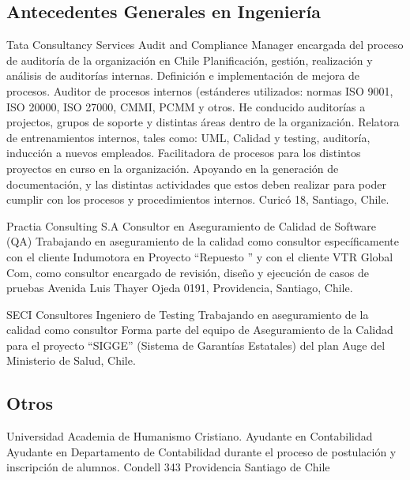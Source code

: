 \documentclass[11pt,letterpaper,roman]{moderncv}
\begin{document}
\subsection{Antecedentes Generales en Ingeniería}
	{Tata Consultancy Services} %
	{Audit and Compliance Manager} %
	{encargada del proceso de auditoría de la organización en Chile}
	{Planificación, gestión, realización y análisis de auditorías internas. Definición e implementación de mejora de procesos. 
	Auditor de procesos internos (estánderes utilizados: normas ISO 9001, ISO 20000, ISO 27000, CMMI, PCMM y otros.
	He conducido auditorías a projectos, grupos de soporte y distintas áreas dentro de la organización. 
	Relatora de entrenamientos internos, tales como: UML, Calidad y testing, auditoría, inducción a nuevos empleados.
	Facilitadora de procesos para los distintos proyectos en curso en la organización.
	Apoyando en la generación de documentación, y las distintas actividades que estos deben realizar para poder cumplir con los procesos y procedimientos internos.
	}
	{Curicó 18, Santiago, Chile.}
	
	{Practia Consulting S.A} %
	{Consultor en Aseguramiento de Calidad de Software (QA)} %
	{Trabajando en aseguramiento de la calidad como consultor}
	{específicamente con el cliente Indumotora en Proyecto  ``Repuesto '' y con el cliente
	VTR Global Com, como consultor encargado de revisión, diseño y ejecución de casos de pruebas
	}
	{Avenida Luis Thayer Ojeda 0191, Providencia, Santiago, Chile.}
	
	
	{SECI Consultores} %
	{Ingeniero de Testing} %
	{Trabajando en aseguramiento de la calidad como consultor}
	{Forma parte del equipo de Aseguramiento de la Calidad para el proyecto ``SIGGE'' (Sistema de Garantías Estatales) del plan Auge del Ministerio de Salud, Chile.
	}
	{}
	

\subsection{Otros}

	{Universidad Academia de Humanismo Cristiano.} %
	{Ayudante en Contabilidad} %
	{Ayudante en Departamento de Contabilidad durante el proceso de postulación y inscripción de alumnos.}
	{}
	{Condell 343 Providencia Santiago de Chile}
	
\end{document}
